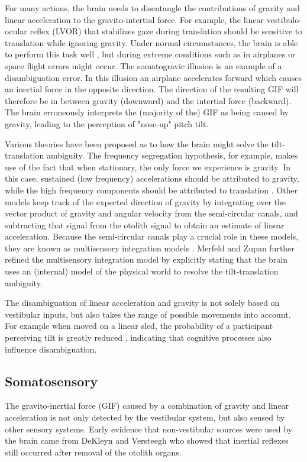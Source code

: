 For many actions, the brain needs to disentangle the contributions of gravity and linear acceleration to the gravito-intertial force. For example, the linear vestibulo-ocular reflex (LVOR) that stabilizes gaze during translation should be sensitive to translation while ignoring gravity. Under normal circumstances, the brain is able to perform this task well \cite{merfeld1995}, but during extreme conditions such as in airplanes or space flight errors might occur. The somatogravic illusion \cite{glasauer1995} is an example of a disambiguation error. In this illusion an airplane accelerates forward which causes an inertial force in the opposite direction. The direction of the resulting GIF will therefore be in between gravity (downward) and the intertial force (backward). The brain erroneously interprets the (majority of the) GIF as being caused by gravity, leading to the perception of "nose-up" pitch tilt.

Various theories have been proposed as to how the brain might solve the tilt-translation ambiguity. The frequency segregation hypothesis, for example, makes use of the fact that when stationary, the only force we experience is gravity. In this case, sustained (low frequency) accelerations should be  attributed to gravity, while the high frequency components should be attributed to translation \cite{paige1991, telford1997}. Other models keep track of the expected direction of gravity by integrating over the vector product of gravity and angular velocity from the semi-circular canals, and subtracting that signal from the otolith signal to obtain an estimate of linear acceleration. Because the semi-circular canals play a crucial role in these models, they are known as multisensory integration models \cite{mayne1974,ormsby1977}. Merfeld and Zupan \citeyear{merfeld1995,merfeld2002} further refined the multisensory integration model by explicitly stating that the brain uses an (internal) model of the physical world to resolve the tilt-translation ambiguity.

The disambiguation of linear acceleration and gravity is not solely based on vestibular inputs, but also takes the range of possible movements into account. For example when moved on a linear sled, the probability of a participant perceiving tilt is greatly reduced \cite{wertheim2001}, indicating that cognitive processes also influence disambiguation.


\subsection{Somatosensory}
The gravito-inertial force (GIF) caused by a combination of gravity and linear acceleration is not only detected by the vestibular system, but also sensed by other sensory systems. Early evidence that non-vestibular sources were used by the brain came from DeKleyn and Versteegh \citeyear{dekleyn1933} who showed that inertial reflexes still occurred after removal of the otolith organs.

